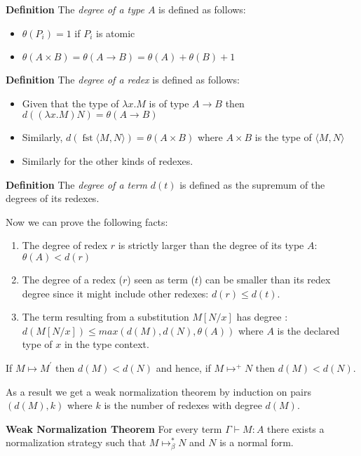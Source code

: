 \begin{mdframed}
	\textbf{Definition}
	The \textit{degree of a type $A$} is defined as follows:
	\begin{itemize}
		\item $\theta(P_i)=1$ if $P_i$ is atomic
		\item $\theta(A\times B)=\theta(A \rightarrow B)= \theta(A)+\theta(B)+1$
	\end{itemize}
\end{mdframed}
\begin{mdframed}
	\textbf{Definition}
	The \textit{degree of a redex} is defined as follows:
	\begin{itemize}
		\item  Given that the type of $\lambda x. M$ is of type $A\rightarrow B$ then  $d((\lambda x. M)N)=\theta(A\rightarrow B)$
		\item Similarly, $d(\operatorname{fst}\langle M, N\rangle)=\theta(A\times B)$
		where $A\times B$ is the type of $\langle M, N\rangle$
		
		\item Similarly for the other kinds of redexes.
	\end{itemize}
\end{mdframed}
\begin{mdframed}
	\textbf{Definition}
	The \textit{degree of a term} $d(t)$ is defined as the supremum of the degrees of its redexes.
\end{mdframed}
Now we can prove the following facts:
\begin{theorem}
	\begin{mdframed}
\begin{enumerate}
	\item The degree of redex $r$ is strictly larger than the degree of its type $A$: 
	$\theta(A)<d(r)$
	\item The degree of a redex ($r$) seen as term ($t$)  can be smaller than its redex degree since it might include other redexes: $d(r)\le d(t)$.
	\item The term resulting from a substitution $M[N/x]$  has degree : $d(M[N/x])\le max(d(M),d(N),\theta(A))$ where $A$ is the declared type of $x$ in the type context.
\end{enumerate}
	\end{mdframed}
\end{theorem}
\begin{mdframed}
	\begin{theorem}
If $M\mapsto M^{\prime}$ then $d(M)<d(N)$ and hence, if $M\mapsto^{+} N$ then $d(M)<d(N)$.
\end{theorem}
\end{mdframed}
As a result we get a weak  normalization theorem by induction on pairs $(d(M),k)$ where $k$ is the number of redexes with degree $d(M)$.
\begin{mdframed}
\begin{theorem}
	\textbf{Weak Normalization Theorem}
For every term $\Gamma\vdash M:A$ there exists a normalization strategy 
such that $M\mapsto_{\beta}^{*}N$ and $N$ is a normal form.
\end{theorem}
\end{mdframed} 

